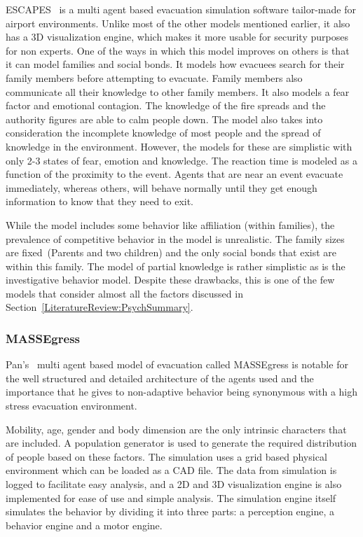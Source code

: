 ESCAPES~\cite{Tsai:2011tz} is a multi agent based evacuation simulation software tailor-made for airport environments. Unlike most of the other models mentioned earlier, it also has a 3D visualization engine, which makes it more usable for security purposes for non experts. One of the ways in which this model improves on others is that it can model families and social bonds. It models how evacuees search for their family members before attempting to evacuate. Family members also communicate all their knowledge to other family members. It also models a fear factor and emotional contagion.  The knowledge of the fire spreads and the authority figures are able to calm people down. The model also takes into consideration the incomplete knowledge of most people and the spread of knowledge in the environment. However, the models for these are simplistic with only 2-3 states of fear, emotion and knowledge. The reaction time is modeled as a function of the proximity to the event. Agents that are near an event evacuate immediately, whereas others, will behave normally until they get enough information to know that they need to exit.

While the model includes some behavior like affiliation (within families), the prevalence of competitive behavior in the model is unrealistic. The family sizes are fixed~(Parents and two children) and the only social bonds that exist are within this family. The model of partial knowledge is rather simplistic as is the investigative behavior model. Despite these drawbacks, this is one of the few models that consider almost all the factors discussed in Section~\ref{LiteratureReview:PsychSummary}.

\subsubsection{MASSEgress}

Pan's~\cite{Pan:2006vp} multi agent based model of evacuation called MASSEgress is notable for the well structured and detailed architecture of the agents used and the importance that he gives to non-adaptive behavior being synonymous with a high stress evacuation environment.

Mobility, age, gender and body dimension are the only intrinsic characters that are included. A population generator is used to generate the required distribution of people based on these factors. The simulation uses a grid based physical environment which can be loaded as a CAD file. The data from simulation is logged to facilitate easy analysis, and a 2D and 3D visualization engine is also implemented for ease of use and simple analysis. The simulation engine itself simulates the behavior by dividing it into three parts: a perception engine, a behavior engine and a motor engine.

